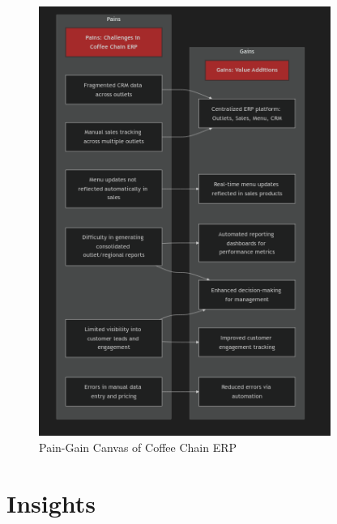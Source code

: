 \begin{figure}[H]
\centering
\includegraphics[width=0.85\textwidth,height=0.6\textheight,keepaspectratio]{diagrams/pain_gain.png}
\caption{Pain-Gain Canvas of Coffee Chain ERP}
\end{figure}

\section*{Insights}

